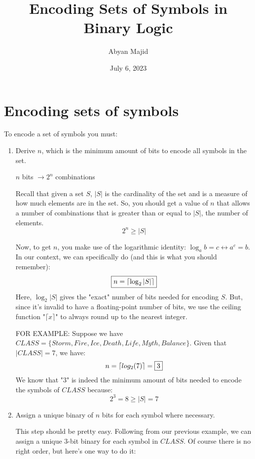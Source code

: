 \documentclass{article}
\begin{document}
\title{Encoding Sets of Symbols in Binary Logic}
\author{Abyan Majid}
\date{July 6, 2023}
\maketitle

\section{Encoding sets of symbols}

To encode a set of symbols you must:
\begin{enumerate}
    \item Derive $n$, which is the minimum amount of bits to encode all symbols in the set.
    \begin{center}
        $n$ bits $\rightarrow 2^n$ combinations 
    \end{center}
    Recall that given a set $S$, $|S|$ is the cardinality of the set and is a measure of how much elements are in the set. So, you should get a value of $n$ that allows a number of combinations that is greater than or equal to $|S|$, the number of elements.
    $$2^n\geq|S|$$
    \begin{center}
        Now, to get $n$, you make use of the logarithmic identity: $\log_a b=c \longleftrightarrow a^c=b$. In our context, we can specifically do (and this is what you should remember):
        \[
        \fbox{$n = \lceil \log_2 |S| \rceil$}
        \]
        Here, $\log_2 |S|$ gives the "exact" number of bits needed for encoding $S$. But, since it's invalid to have a floating-point number of bits, we use the ceiling function "$\lceil x \rceil$" to always round up to the nearest integer.
    \end{center}
    \begin{center}
        FOR EXAMPLE: Suppose we have $CLASS=\{Storm, Fire, Ice, Death, Life, Myth, Balance\}$. Given that $|CLASS|=7$, we have:
        $$n=\lceil log_2 (7) \rceil=\fbox{3}$$
        We know that "3" is indeed the minimum amount of bits needed to encode the symbols of $CLASS$ because:
        $$2^3=8\geq|S|=7$$
    \end{center}
    \item Assign a unique binary of $n$ bits for each symbol where necessary.
    \begin{center}
        This step should be pretty easy. Following from our previous example, we can assign a unique 3-bit binary for each symbol in $CLASS$. Of course there is no right order, but here's one way to do it: \\

\end{center}
\end{enumerate}
\end{document}
